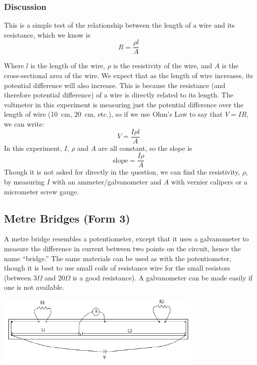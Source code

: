 \subsubsection{Discussion}

This is a simple test of the relationship between the length of a wire and its
resistance, which we know is $$R=\frac{\rho l}{A} $$

Where $l$ is the length of the wire, $\rho$ is the resistivity of the wire, and $A$ is the cross-sectional
area of the wire. We expect that as the length of wire increases, its potential difference
will also increase. This is because the resistance (and therefore potential difference) of a wire is
directly related to its length. The voltmeter in this experiment is measuring just the
potential difference over the length of wire (10~cm, 20~cm, etc.), so if we use Ohm’s Law to say that $V = IR$, we can write:\\
$$ V = \frac{I \rho l}{A} $$
In this experiment, $I$, $\rho$ and $A$ are all constant, so the slope is
$$\mathrm{slope} = \frac{I \rho}{A} $$
Though it is not asked for directly in the question, we can find the resistivity, $\rho$, by measuring $I$ with an ammeter/galvanometer and $A$ with vernier calipers or a micrometer screw gauge.

\subsection{Metre Bridges (Form 3)}

A metre bridge resembles a potentiometer, except that it uses a galvanometer to
measure the difference in current between two points on the circuit, hence the name
``bridge.'' The same materials can be used as with the potentiometer, though it is best to
use small coils of resistance wire for the small resistors (between 3$\Omega$ and 20$\Omega$ is a good resistance). A galvanometer can be made easily if one is not available.

\begin{center}
\includegraphics[width=10cm]{./img/meter-bridge-2.png}
\end{center}

